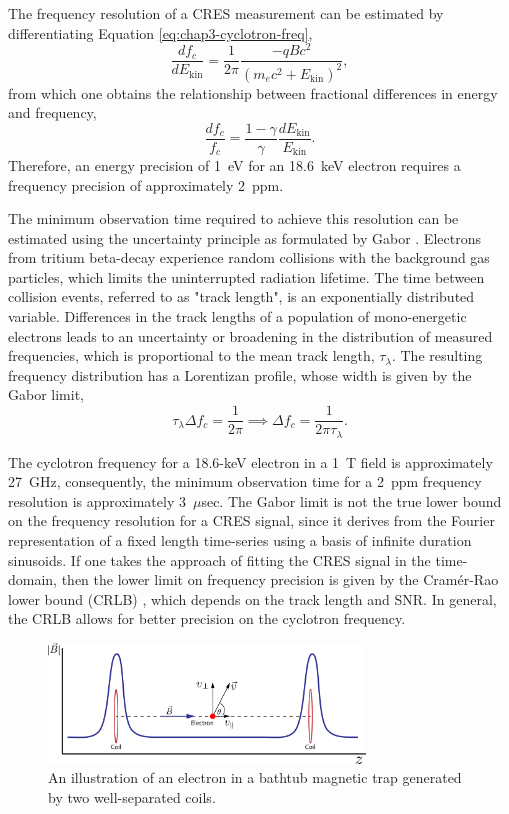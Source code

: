 The frequency resolution of a CRES measurement can be estimated by differentiating Equation \ref{eq:chap3-cyclotron-freq},
\begin{equation}
    \frac{df_c}{dE_\mathrm{kin}} = \frac{1}{2\pi}\frac{-qBc^2}{\left(m_ec^2+E_\mathrm{kin}\right)^2},
\end{equation}
from which one obtains the relationship between fractional differences in energy and frequency,
\begin{equation}
    \frac{df_c}{f_c}=\frac{1-\gamma}{\gamma}\frac{dE_\mathrm{kin}}{E_\mathrm{kin}}.
\end{equation}
Therefore, an energy precision of 1~eV for an 18.6~keV electron requires a frequency precision of approximately 2~ppm.

The minimum observation time required to achieve this resolution can be estimated using the uncertainty principle as formulated by Gabor \cite{gabor}. Electrons from tritium beta-decay experience random collisions with the background gas particles, which limits the uninterrupted radiation lifetime. The time between collision events, referred to as "track length", is an exponentially distributed variable. Differences in the track lengths of a population of mono-energetic electrons leads to an uncertainty or broadening in the distribution of measured frequencies, which is proportional to the mean track length, $\tau_\lambda$. The resulting frequency distribution has a Lorentizan profile, whose width is given by the Gabor limit,
\begin{equation}
    \tau_\lambda\Delta f_c=\frac{1}{2\pi}\implies\Delta f_c=\frac{1}{2\pi\tau_\lambda}.
\end{equation}

The cyclotron frequency for a 18.6-keV electron in a 1~T field is approximately 27~GHz, consequently, the minimum observation time for a 2~ppm frequency resolution is approximately 3~$\mu$sec. The Gabor limit is not the true lower bound on the frequency resolution for a CRES signal, since it derives from the Fourier representation of a fixed length time-series using a basis of infinite duration sinusoids. If one takes the approach of fitting the CRES signal in the time-domain, then the lower limit on frequency precision is given by the Cram\'{e}r-Rao lower bound (CRLB) \cite{nick_viterbi}, which depends on the track length and SNR. In general, the CRLB allows for better precision on the cyclotron frequency.

\begin{figure}[htbp]
    \centering
    \includegraphics*[width=0.75\textwidth]{figs/Chapter-3/230628_bathtub_trap.png}
    \caption{\label{fig:chap3-bathtub-trap}An illustration of an electron in a bathtub magnetic trap generated by two well-separated coils.}
\end{figure}

